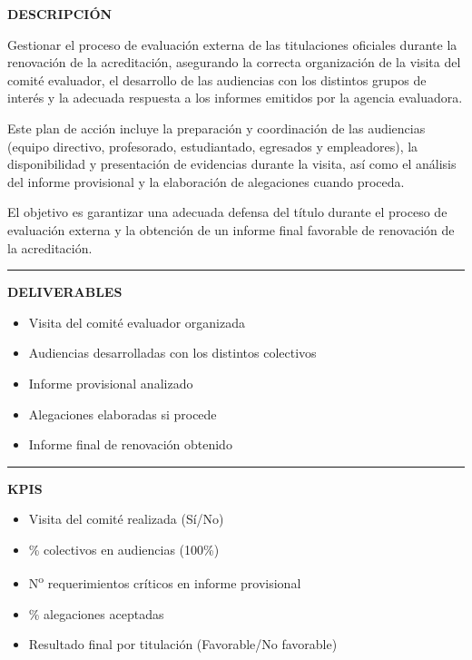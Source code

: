 \documentclass[11pt,a4paper]{scrreprt}
\newcommand{\fieldlabel}[1]{%
  {\footnotesize\sffamily\bfseries\color{mutedcolor}\MakeUppercase{#1}}\par\nopagebreak[4]
}
\newcommand{\fieldsep}{\vspace{3pt}\noindent\textcolor{bordercolor}{\rule{\linewidth}{0.4pt}}\vspace{3pt}\par}
\begin{document}
\begin{tcolorbox}[pabox={aacolor}{PA3.2 \enspace\textbullet\enspace Gestión del proceso de evaluación externa y renovación de la acreditación}]

\fieldlabel{Descripci\'on}
{\small Gestionar el proceso de evaluación externa de las titulaciones oficiales durante la renovación de la acreditación, asegurando la correcta organización de la visita del comité evaluador, el desarrollo de las audiencias con los distintos grupos de interés y la adecuada respuesta a los informes emitidos por la agencia evaluadora. 

Este plan de acción incluye la preparación y coordinación de las audiencias (equipo directivo, profesorado, estudiantado, egresados y empleadores), la disponibilidad y presentación de evidencias durante la visita, así como el análisis del informe provisional y la elaboración de alegaciones cuando proceda. 

El objetivo es garantizar una adecuada defensa del título durante el proceso de evaluación externa y la obtención de un informe final favorable de renovación de la acreditación. }\par
\fieldsep
\fieldlabel{Deliverables}
{\small \begin{itemize}[noitemsep,topsep=2pt]
\item Visita del comité evaluador organizada
\item Audiencias desarrolladas con los distintos colectivos
\item Informe provisional analizado
\item Alegaciones elaboradas si procede
\item Informe final de renovación obtenido
\end{itemize}}\par
\fieldsep
\fieldlabel{KPIs}
{\small \begin{itemize}[noitemsep,topsep=2pt]
\item Visita del comité realizada (Sí/No)
\item \% colectivos en audiencias (100\%)
\item N\textsuperscript{o} requerimientos críticos en informe provisional
\item \% alegaciones aceptadas
\item Resultado final por titulación (Favorable/No favorable)
\end{itemize}}\par
\end{tcolorbox}
\end{document}
